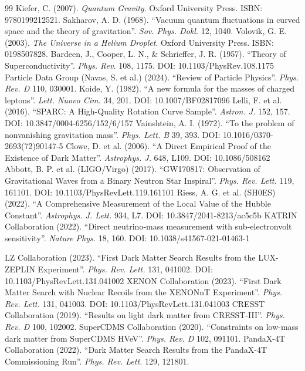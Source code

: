 \documentclass[a4paper,12pt]{article}
\begin{document}
\begin{thebibliography}{99}
 Kiefer, C. (2007). \textit{Quantum Gravity}. Oxford University Press. ISBN: 9780199212521.
 Sakharov, A. D. (1968). ``Vacuum quantum fluctuations in curved space and the theory of gravitation''. \textit{Sov. Phys. Dokl.} 12, 1040.
 Volovik, G. E. (2003). \textit{The Universe in a Helium Droplet}. Oxford University Press. ISBN: 0198507828.
 Bardeen, J., Cooper, L. N., \& Schrieffer, J. R. (1957). ``Theory of Superconductivity''. \textit{Phys. Rev.} 108, 1175. DOI: 10.1103/PhysRev.108.1175
 Particle Data Group (Navas, S. et al.) (2024). ``Review of Particle Physics''. \textit{Phys. Rev. D} 110, 030001.
 Koide, Y. (1982). ``A new formula for the masses of charged leptons''. \textit{Lett. Nuovo Cim.} 34, 201. DOI: 10.1007/BF02817096
 Lelli, F. et al. (2016). ``SPARC: A High-Quality Rotation Curve Sample''. \textit{Astron. J.} 152, 157. DOI: 10.3847/0004-6256/152/6/157
 Vainshtein, A. I. (1972). ``To the problem of nonvanishing gravitation mass''. \textit{Phys. Lett. B} 39, 393. DOI: 10.1016/0370-2693(72)90147-5
 Clowe, D. et al. (2006). ``A Direct Empirical Proof of the Existence of Dark Matter''. \textit{Astrophys. J.} 648, L109. DOI: 10.1086/508162
 Abbott, B. P. et al. (LIGO/Virgo) (2017). ``GW170817: Observation of Gravitational Waves from a Binary Neutron Star Inspiral''. \textit{Phys. Rev. Lett.} 119, 161101. DOI: 10.1103/PhysRevLett.119.161101
 Riess, A. G. et al. (SH0ES) (2022). ``A Comprehensive Measurement of the Local Value of the Hubble Constant''. \textit{Astrophys. J. Lett.} 934, L7. DOI: 10.3847/2041-8213/ac5c5b
 KATRIN Collaboration (2022). ``Direct neutrino-mass measurement with sub-electronvolt sensitivity''. \textit{Nature Phys.} 18, 160. DOI: 10.1038/s41567-021-01463-1


 LZ Collaboration (2023). ``First Dark Matter Search Results from the LUX-ZEPLIN Experiment''. \textit{Phys. Rev. Lett.} 131, 041002. DOI: 10.1103/PhysRevLett.131.041002
 XENON Collaboration (2023). ``First Dark Matter Search with Nuclear Recoils from the XENONnT Experiment''. \textit{Phys. Rev. Lett.} 131, 041003. DOI: 10.1103/PhysRevLett.131.041003
 CRESST Collaboration (2019). ``Results on light dark matter from CRESST-III''. \textit{Phys. Rev. D} 100, 102002.
 SuperCDMS Collaboration (2020). ``Constraints on low-mass dark matter from SuperCDMS HVeV''. \textit{Phys. Rev. D} 102, 091101.
 PandaX-4T Collaboration (2022). ``Dark Matter Search Results from the PandaX-4T Commissioning Run''. \textit{Phys. Rev. Lett.} 129, 121801.


\end{thebibliography}
\end{document}
